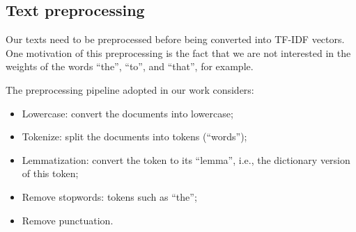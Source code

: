 \subsection{Text preprocessing}

    Our texts need to be preprocessed before being converted into TF-IDF vectors. One motivation of this preprocessing is the fact that we are not interested in the weights of the words ``the'', ``to'', and ``that'', for example.

    The preprocessing pipeline adopted in our work considers:
    \begin{itemize}
    \item Lowercase: convert the documents into lowercase;
    \item Tokenize: split the documents into tokens (``words'');
    \item Lemmatization: convert the token to its ``lemma'', i.e., the dictionary version of this token;
    \item Remove stopwords: tokens such as ``the'';
    \item Remove punctuation.
    \end{itemize}

